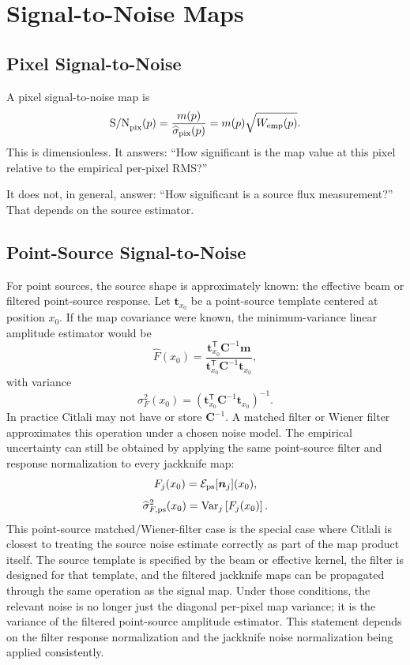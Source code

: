 \documentclass[11pt]{article}
\newcommand{\map}{\boldsymbol{m}}
\newcommand{\noise}{\boldsymbol{n}}
\newcommand{\cov}{\boldsymbol{C}}
\newcommand{\mat}[1]{\boldsymbol{#1}}
\newcommand{\trans}{\mathsf{T}}
\newcommand{\inv}{^{-1}}
\newcommand{\var}{\operatorname{Var}}
\newcommand{\snr}{\mathrm{S/N}}
\begin{document}
\section{Signal-to-Noise Maps}

\subsection{Pixel Signal-to-Noise}

A pixel signal-to-noise map is
\[
  \snr_{\rm pix}(p) =
    \frac{m(p)}{\widehat{\sigma}_{\rm pix}(p)}
    =
    m(p)\sqrt{W_{\rm emp}(p)}.
\]
This is dimensionless. It answers: ``How significant is the map value at this
pixel relative to the empirical per-pixel RMS?''

It does not, in general, answer: ``How significant is a source flux
measurement?'' That depends on the source estimator.

\subsection{Point-Source Signal-to-Noise}

For point sources, the source shape is approximately known: the effective beam
or filtered point-source response. Let \(\mat{t}_{x_0}\) be a point-source
template centered at position \(x_0\). If the map covariance were known, the
minimum-variance linear amplitude estimator would be
\[
  \widehat{F}(x_0) =
    \frac{
      \mat{t}_{x_0}^\trans \cov\inv \map
    }{
      \mat{t}_{x_0}^\trans \cov\inv \mat{t}_{x_0}
    },
\]
with variance
\[
  \sigma_F^2(x_0) =
    \left(
      \mat{t}_{x_0}^\trans \cov\inv \mat{t}_{x_0}
    \right)^{-1}.
\]
In practice Citlali may not have or store \(\cov\inv\). A matched filter or
Wiener filter approximates this operation under a chosen noise model. The
empirical uncertainty can still be obtained by applying the same point-source
filter and response normalization to every jackknife map:
\[
  F_j(x_0) =
    {\cal E}_{\rm ps}[\noise_j](x_0),
\]
\[
  \widehat{\sigma}_{F,\rm ps}^2(x_0) =
    \var_j \left[ F_j(x_0) \right].
\]
This point-source matched/Wiener-filter case is the special case where Citlali
is closest to treating the source noise estimate correctly as part of the map
product itself. The source template is specified by the beam or effective
kernel, the filter is designed for that template, and the filtered jackknife
maps can be propagated through the same operation as the signal map. Under
those conditions, the relevant noise is no longer just the diagonal per-pixel
map variance; it is the variance of the filtered point-source amplitude
estimator. This statement depends on the filter response normalization and the
jackknife noise normalization being applied consistently.
\end{document}
